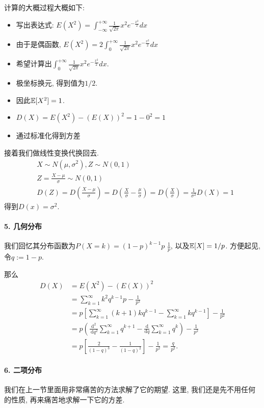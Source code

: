 计算的大概过程大概如下: 
\begin{itemize}
    \item 写出表达式: $E\left(X^2\right)=\int_{-\infty}^{+\infty} \frac{1}{\sqrt{2 \pi}} x^2 e^{-\frac{x^2}{2}} d x$
    \item 由于是偶函数, $E\left(X^2\right)=2 \int_0^{+\infty} \frac{1}{\sqrt{2 \pi}} x^2 e^{-\frac{x^2}{2}} d x$
    \item 希望计算出$\int_0^{+\infty} \frac{1}{\sqrt{2 \pi}} x^2 e^{-\frac{x^2}{2}} d x$.
    \item 极坐标换元, 得到值为$1/2$.
    \item 因此$\mathbb E[X^2]=1$.
    \item $D(X)=E\left(X^2\right)-(E(X))^2=1-0^2=1$
    \item 通过标准化得到方差
\end{itemize}

接着我们做线性变换代换回去. 
$$
\begin{aligned}
& X \sim N\left(\mu, \sigma^2\right), Z \sim N(0,1) \\
& Z=\frac{X-\mu}{\sigma} \sim N(0,1) \\
& D(Z)=D\left(\frac{X-\mu}{\sigma}\right)=D\left(\frac{X}{\sigma}-\frac{\mu}{\sigma}\right)=D\left(\frac{X}{\sigma}\right)=\frac{1}{\sigma^2} D(X)=1
\end{aligned}
$$
得到$D(x)=\sigma^2$.

\paragraph{5. 几何分布 } 我们回忆其分布函数为$P(X=k)=(1-p)^{k-1} p$ $\frac{1}{p}$, 以及$\mathbb E[X]=1/p$. 方便起见, 令$q:=1-p$. 

那么
$$\begin{aligned} D(X) & =E\left(X^2\right)-(E(X))^2 \\ & =\sum_{k=1}^{\infty} k^2 q^{k-1} p-\frac{1}{p^2} \\ & =p\left[\sum_{k=1}^{\infty}(k+1) k q^{k-1}-\sum_{k=1}^{\infty} k q^{k-1}\right]-\frac{1}{p^2} \\ & =p\left(\frac{\mathrm{d}^2}{\mathrm{~d} q^2} \sum_{k=1}^{\infty} q^{k+1}-\frac{\mathrm{d}}{\mathrm{d} q} \sum_{k=1}^{\infty} q^k\right)-\frac{1}{p^2} \\ & =p\left[\frac{2}{(1-q)^3}-\frac{1}{(1-q)^2}\right]-\frac{1}{p^2}=\frac{q}{p^2} .\end{aligned}$$

\paragraph{6. 二项分布} 
我们在上一节里面用非常痛苦的方法求解了它的期望. 这里, 我们还是先不用任何的性质, 再来痛苦地求解一下它的方差. 

